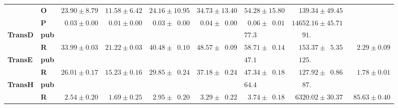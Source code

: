 \begin{tabular}{llrrrrrrr}
       & \textbf{O} &            $23.90 \pm 8.79$ &            $11.58 \pm 6.42$ &                      $24.16 \pm 10.95$ &                      $34.73 \pm 13.40$ &                      $54.28 \pm 15.80$ &            $\phantom{00}139.34 \pm 49.45$ &                              \\
       & \textbf{P} &  $\phantom{0}0.03 \pm 0.00$ &  $\phantom{0}0.01 \pm 0.00$ &  $\phantom{0}0.03 \pm \phantom{0}0.00$ &  $\phantom{0}0.04 \pm \phantom{0}0.00$ &  $\phantom{0}0.06 \pm \phantom{0}0.01$ &                      $14652.16 \pm 45.71$ &                              \\\midrule
\textbf{TransD} & \textbf{pub} &                             &                             &                                        &                                        &            $77.3\phantom{0 \pm 00.00}$ &  $\phantom{000}91.\phantom{00 \pm 00.00}$ &                              \\
       & \textbf{R} &            $33.99 \pm 0.03$ &            $21.22 \pm 0.03$ &            $40.48 \pm \phantom{0}0.10$ &            $48.57 \pm \phantom{0}0.09$ &            $58.71 \pm \phantom{0}0.14$ &  $\phantom{00}153.37 \pm \phantom{0}5.35$ &  $\phantom{00}2.29 \pm 0.09$ \\\midrule
\textbf{TransE} & \textbf{pub} &                             &                             &                                        &                                        &            $47.1\phantom{0 \pm 00.00}$ &  $\phantom{00}125.\phantom{00 \pm 00.00}$ &                              \\
       & \textbf{R} &            $26.01 \pm 0.17$ &            $15.23 \pm 0.16$ &            $29.85 \pm \phantom{0}0.24$ &            $37.18 \pm \phantom{0}0.24$ &            $47.34 \pm \phantom{0}0.18$ &  $\phantom{00}127.92 \pm \phantom{0}0.86$ &  $\phantom{00}1.78 \pm 0.01$ \\\midrule
\textbf{TransH} & \textbf{pub} &                             &                             &                                        &                                        &            $64.4\phantom{0 \pm 00.00}$ &  $\phantom{000}87.\phantom{00 \pm 00.00}$ &                              \\
       & \textbf{R} &  $\phantom{0}2.54 \pm 0.20$ &  $\phantom{0}1.69 \pm 0.25$ &  $\phantom{0}2.95 \pm \phantom{0}0.20$ &  $\phantom{0}3.29 \pm \phantom{0}0.22$ &  $\phantom{0}3.74 \pm \phantom{0}0.18$ &            $\phantom{0}6320.02 \pm 30.37$ &  $\phantom{0}85.63 \pm 0.40$ \\

\end{tabular}
